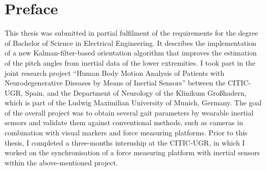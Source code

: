 \chapter{Preface}

This thesis was submitted in partial fulfilment of the requirements for the degree of Bachelor of Science in Electrical Engineering. It describes the implementation of a new Kalman-filter-based orientation algorithm that improves the estimation of the pitch angles from inertial data of the lower extremities. I took part in the joint research project “\mbox{Human} Body Motion Analysis of Patients with Neurodegenerative Diseases by Means of Inertial Sensors” between the \gls{CITIC-UGR}, Spain, and the Department of Neurology of the Klinikum Großhadern, which is part of the Ludwig Maximilian University of \mbox{Munich}, Germany. The goal of the overall project was to obtain several gait parameters by wearable inertial sensors and validate them against conventional methods, such as cameras in combination with visual markers and force measuring platforms. Prior to this thesis, I completed a three-months internship at the \gls{CITIC-UGR}, in which I worked on the synchronisation of a force measuring platform with inertial sensors within the above-mentioned project.